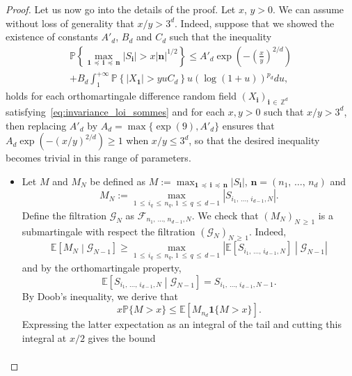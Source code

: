 \documentclass[10pt]{amsart}
\theoremstyle{definition}\newtheorem{defi}[theo]{Definition}\newtheorem{rema}[theo]{Remark}\newtheorem{exam}[theo]{Example}\newtheorem{exem}[theo]{Example}\newtheorem{nota}[theo]{Notation}
\newcommand{\Fca}{\mathcal{F}}
\newcommand{\Gca}{\mathcal{G}}
\newcommand{\bfun}{\mathbf{1}}
\newcommand\PP{\mathbb{P}}
\newcommand\Z{\mathbb{Z}}
\newcommand{\bbE}{\mathbb{E}}
\newcommand\ens[1]{\{ #1\}}
\newcommand\abs[1]{|#1|}
\newcommand{\pr}[1]{(#1)}
\newcommand{\gr}[1]{\bm{#1}}
\newcommand{\gri}{\bm{i}}
\newcommand{\grn}{\bm{n}}
\newcommand{\imd}{\preccurlyeq}
\begin{document}
\begin{proof}
Let us now go into the details of the proof. Let $x$, $y>0$. We can assume without loss of generality that $x/y>3^d$. Indeed, suppose that we showed the existence of constants $A'_d$, $B_d$ and $C_d$ such that the inequality
\begin{multline}
\PP\left\{\max_{\gr{1}\,\imd\,\gri\,\imd\,\gr{n} } \left|S_{\gri} \right| >x\left|\grn\right|^{1/2}\right\}\leq A'_d\exp\left(-\left(\frac{x}{y}\right)^{2/d}\right)
\\+B_d\int_1^{+\infty}\PP\left\{\left|X_{\gr{1}}\right|>yuC_d\right\} u\left(\log\pr{1+u}\right)^{p_d}du,
\end{multline}
holds for each orthomartingale difference random field $\pr{X_{\gri}}_{\gri\,\in\,\Z^d}$ satisfying~\eqref{eq:invariance_loi_sommes} and for each $x,y>0$ such that $x/y>3^d$, then replacing $A'_d$ by $A_d=\max\ens{\exp\pr{9},A'_d}$ ensures that $A_d\exp\pr{-\pr{x/y}^{2/d}}
\geq 1$ when $x/y \leq 3^d$, so that the desired inequality becomes trivial in this range of parameters.
\begin{itemize}
\item[\eqref{step1}] Let $M$ and $M_N$ be defined as $M:=\max_{\gr{1}\,\imd\,\gri\,\imd\,\gr{n}} \abs{S_{\gri} }$, $\grn=\pr{n_1,\,\dots,\,n_d}$ and
\begin{equation}
M_N:=\max_{1\,\leq\,i_q\,\leq\,n_q,\,1\,\leq\,q\,\leq\,d-1}
\left|S_{i_1,\,\dots,\,i_{d-1},N}\right|.
\end{equation}
Define the filtration $\Gca_N$ as $\Fca_{n_1,\,\dots,\,n_{d-1}, N}$. We check that $\pr{M_N}_{N\,\geq\,1}$ is a submartingale with respect the filtration $\pr{\Gca_N}_{N\,\geq\,1}$. Indeed,
\begin{equation}
\bbE\left[M_N\middle| \Gca_{N-1}\right]
\geq \max_{1\,\leq\,i_q\,\leq\,n_q,\,1\,\leq\,q\,\leq\,d-1}
\left|\bbE\left[S_{i_1,\,\dots,\,i_{d-1},N}\right]\middle|\Gca_{N-1} \right|
\end{equation}
and by the orthomartingale property,
\begin{equation}
\bbE\left[S_{i_1,\,\dots,\,i_{d-1},N}\middle|\Gca_{N-1}\right] =S_{i_1,\,\dots,\,i_{d-1},N-1}.
\end{equation}
By Doob's inequality, we derive that
\begin{equation}
x\PP\ens{M>x}\leq \bbE\left[M_{n_d}\bfun\ens{M>x}\right].
\end{equation}
Expressing the latter expectation as an integral of the tail and cutting this integral at $x/2$ gives the bound
\begin{multline}\label{eq:first_step_induction}

\end{multline}
\end{itemize}
\end{proof}
\end{document}
